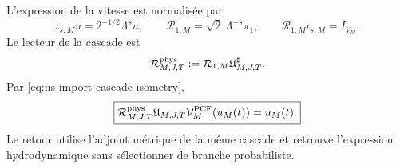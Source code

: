 L'expression de la vitesse est normalisée par
\begin{equation}
 \iota_{s,M}u=2^{-1/2}\Lambda^su,
 \qquad
 \mathcal R_{1,M}=\sqrt2\,\Lambda^{-s}\pi_1,
 \qquad
 \mathcal R_{1,M}\iota_{s,M}=I_{V_M}.
 \label{eq:ns-import-grade-one-return}
\end{equation}
Le lecteur de la cascade est
\begin{equation}
 \mathcal R_{M,J,T}^{\rm phys}
 :=\mathcal R_{1,M}\mathfrak U_{M,J,T}^{\sharp}.
 \label{eq:ns-import-full-return}
\end{equation}
Par \eqref{eq:ns-import-cascade-isometry},
\begin{equation}
 \boxed{
 \mathcal R_{M,J,T}^{\rm phys}
 \mathfrak U_{M,J,T}\mathcal V_M^{\rm PCF}(u_M(t))
 =u_M(t).}
 \label{eq:ns-import-exact-return}
\end{equation}
Le retour utilise l'adjoint métrique de la même cascade et retrouve l'expression hydrodynamique sans sélectionner de branche probabiliste.
